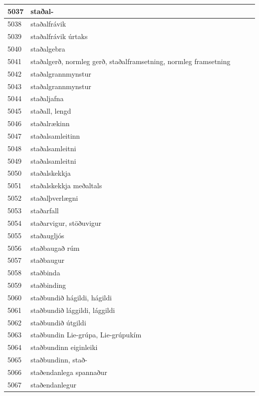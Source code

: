 \begin{longtable}{p{}|p{}|p{}|p{}|p{}}
\hline
5037 & staðal- &  &  &  \\
\hline
5038 & staðalfrávik &  &  &  \\
\hline
5039 & staðalfrávik úrtaks &  &  &  \\
\hline
5040 & staðalgebra &  &  &  \\
\hline
5041 & staðalgerð, normleg gerð, staðalframsetning, normleg framsetning &  &  &  \\
\hline
5042 & staðalgrannmynstur &  &  &  \\
\hline
5043 & staðalgrannmynstur &  &  &  \\
\hline
5044 & staðaljafna &  &  &  \\
\hline
5045 & staðall, lengd &  &  &  \\
\hline
5046 & staðalrækinn &  &  &  \\
\hline
5047 & staðalsamleitinn &  &  &  \\
\hline
5048 & staðalsamleitni &  &  &  \\
\hline
5049 & staðalsamleitni &  &  &  \\
\hline
5050 & staðalskekkja &  &  &  \\
\hline
5051 & staðalskekkja meðaltals &  &  &  \\
\hline
5052 & staðalþverlægni &  &  &  \\
\hline
5053 & staðarfall &  &  &  \\
\hline
5054 & staðarvigur, stöðuvigur &  &  &  \\
\hline
5055 & staðaugljós &  &  &  \\
\hline
5056 & staðbaugað rúm &  &  &  \\
\hline
5057 & staðbaugur &  &  &  \\
\hline
5058 & staðbinda &  &  &  \\
\hline
5059 & staðbinding &  &  &  \\
\hline
5060 & staðbundið hágildi, hágildi &  &  &  \\
\hline
5061 & staðbundið lággildi, lággildi &  &  &  \\
\hline
5062 & staðbundið útgildi &  &  &  \\
\hline
5063 & staðbundin Lie-grúpa, Lie-grúpukím &  &  &  \\
\hline
5064 & staðbundinn eiginleiki &  &  &  \\
\hline
5065 & staðbundinn, stað- &  &  &  \\
\hline
5066 & staðendanlega spannaður &  &  &  \\
\hline
5067 & staðendanlegur &  &  &  \\

\end{longtable}
